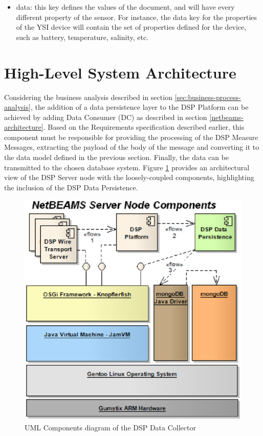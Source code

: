 \begin{itemize}
  \item data: this key defines the values of the document, and will have every
  different property of the sensor. For instance, the data key for the
  properties of the YSI device will contain the set of properties defined for
  the device, such as battery, temperature, salinity, etc.
\end{itemize}

\section{High-Level System Architecture}

Considering the business analysis described in section
\ref{sec:business-process-analysis}, the addition of a data persistence layer
to the DSP Platform can be achieved by adding Data Consumer (DC) as described
in section \ref{netbeams-architecture}. Based on the Requirements
specification described earlier, this component must be responsible for
providing the processing of the DSP Measure Messages, extracting the payload of
the body of the message and converting it to the data model defined in the
previous section. Finally, the data can be transmitted to the chosen database
system. Figure \ref{fig:NetBEAMS-Persistence-Server-Node-Components} provides
an architectural view of the DSP Server node with the loosely-coupled
components, highlighting the inclusion of the DSP Data Persistence.

\begin{figure}[!b]
  \centering
  \includegraphics[scale=0.5]{../diagrams/NetBEAMS-Persistence-Server-Node-Components}
  \caption{UML Components diagram of the DSP Data Collector}
  \label{fig:NetBEAMS-Persistence-Server-Node-Components}
\end{figure}

